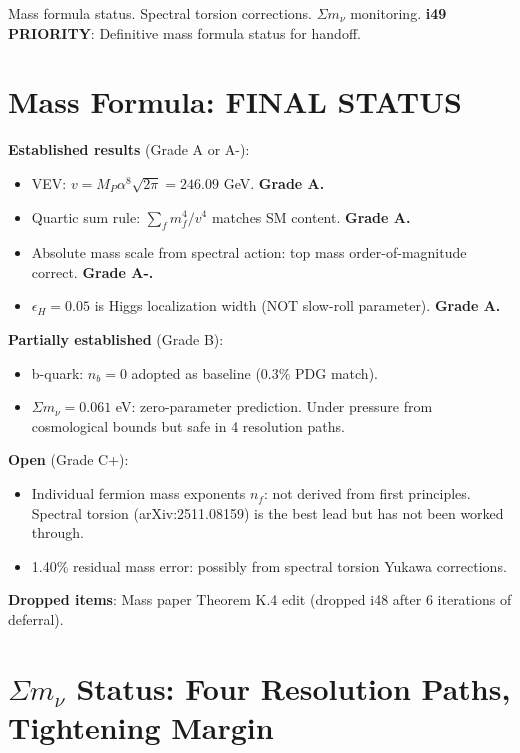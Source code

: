 \documentclass[11pt,a4paper]{article}
\begin{document}
Mass formula status. Spectral torsion corrections. $\Sigma m_\nu$ monitoring. \textbf{i49 PRIORITY}: Definitive mass formula status for handoff.

\section{Mass Formula: FINAL STATUS}

\begin{tcolorbox}[colback=green!5!white, colframe=green!60!black,
  title={Mass Formula Hierarchy: Definitive Status}]

\textbf{Established results} (Grade A or A-):
\begin{itemize}
\item VEV: $v = M_P \alpha^8 \sqrt{2\pi} = 246.09$ GeV. \textbf{Grade A.}
\item Quartic sum rule: $\sum_f m_f^4 / v^4$ matches SM content. \textbf{Grade A.}
\item Absolute mass scale from spectral action: top mass order-of-magnitude correct. \textbf{Grade A-.}
\item $\epsilon_H = 0.05$ is Higgs localization width (NOT slow-roll parameter). \textbf{Grade A.}
\end{itemize}

\textbf{Partially established} (Grade B):
\begin{itemize}
\item b-quark: $n_b = 0$ adopted as baseline (0.3\% PDG match).
\item $\Sigma m_\nu = 0.061$ eV: zero-parameter prediction. Under pressure from cosmological bounds but safe in 4 resolution paths.
\end{itemize}

\textbf{Open} (Grade C+):
\begin{itemize}
\item Individual fermion mass exponents $n_f$: not derived from first principles. Spectral torsion (arXiv:2511.08159) is the best lead but has not been worked through.
\item 1.40\% residual mass error: possibly from spectral torsion Yukawa corrections.
\end{itemize}

\textbf{Dropped items}: Mass paper Theorem K.4 edit (dropped i48 after 6 iterations of deferral).
\end{tcolorbox}

\section{$\Sigma m_\nu$ Status: Four Resolution Paths, Tightening Margin}
\end{document}
